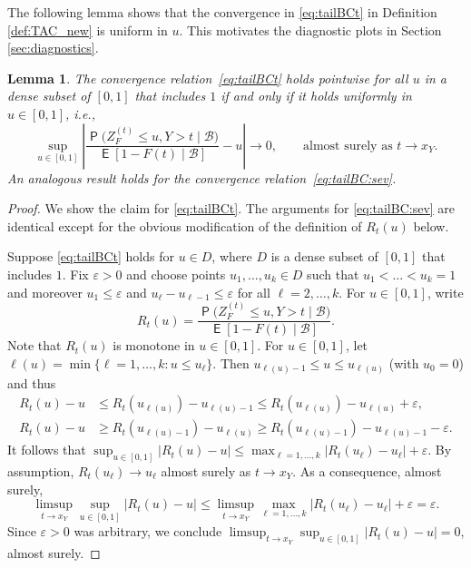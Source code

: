 \documentclass[12pt]{article}
\newcommand{\E}{\operatorname{\mathsf{E}}}
\newcommand{\Q}{\operatorname{\mathsf{P}}}
\newcommand{\Bb}{\mathcal{B}}
\newcommand{\1}{\mathbf{1}} %
\newcommand{\eps}{\varepsilon}
\newcommand{\ZFt}{Z_{F}^{(t)}} %
\newtheorem{lemma}[propo]{Lemma}
\theoremstyle{definition}
\begin{document}
The following lemma shows that the convergence in \eqref{eq:tailBCt} in Definition \ref{def:TAC_new} is uniform in $u$. This motivates the diagnostic plots in Section \ref{sec:diagnostics}.

\begin{lemma}
\label{lem:unifconv-u}
	The convergence relation~\eqref{eq:tailBCt} holds pointwise for all $u$ in a dense subset of $[0, 1]$ that includes $1$ if and only if it holds uniformly in $u \in [0, 1]$, i.e.,
	\[
		\sup_{u \in [0, 1]} \left|
			\frac{\Q\bigl(\ZFt \le u, Y > t \mid \Bb\bigr)}{\E[1-F(t)\mid \Bb]} - u
		\right|
		\to 0, \qquad \text{almost surely as $t \to x_Y$.}
	\]
    An analogous result holds for the convergence relation~\eqref{eq:tailBC:sev}.
\end{lemma}

\begin{proof}
	We show the claim for \eqref{eq:tailBCt}. The arguments for \eqref{eq:tailBC:sev} are identical except for the obvious modification of the definition of $R_t(u)$ below.

	Suppose \eqref{eq:tailBCt} holds for $u \in D$, where $D$ is a dense subset of $[0, 1]$ that includes $1$. Fix $\eps > 0$ and choose points $u_1,\ldots,u_k \in D$ such that $u_1 < \ldots < u_k = 1$ and moreover $u_1 \le \eps$ and $u_\ell - u_{\ell-1} \le \eps$ for all $\ell = 2, \ldots, k$. For $u \in [0, 1]$, write
	\[
		R_t(u) 
		= \frac{\Q\bigl(\ZFt \le u, Y > t \mid \Bb\bigr)}{\E[1-F(t)\mid \Bb]}.
	\]
	Note that $R_t(u)$ is monotone in $u \in [0, 1]$. For $u \in [0, 1]$, let $\ell(u) = \min \{ \ell = 1,\ldots,k : u \le u_\ell \}$. Then $u_{\ell(u)-1} \le u \le u_{\ell(u)}$ (with $u_0 = 0$) and thus
	\begin{align*}
		R_t(u) - u 
		&\le R_t(u_{\ell(u)}) - u_{\ell(u)-1}
		\le R_t(u_{\ell(u)}) - u_{\ell(u)} + \eps,\\
		R_t(u) - u
		&\ge R_t(u_{\ell(u)-1}) - u_{\ell(u)}
		\ge R_t(u_{\ell(u)-1}) - u_{\ell(u)-1} - \eps.
	\end{align*}
	It follows that
		$\sup_{u \in [0, 1]}
		\left| R_t(u) - u \right|
		\le \max_{\ell=1,\ldots,k}
		\left| R_t(u_\ell) - u_\ell \right| + \eps$.
	By assumption, $R_t(u_\ell) \to u_\ell$ almost surely as $t \to x_Y$.
	As a consequence, almost surely, 
 \[\limsup_{t \to x_Y} \sup_{u \in [0, 1]}
		\left| R_t(u) - u \right| 
		\le \limsup_{t \to x_Y} \max_{\ell=1,\ldots,k}
		\left| R_t(u_\ell) - u_\ell \right|
		+ \eps
		= \eps.
  \]
	Since $\eps > 0$ was arbitrary, we conclude $\limsup_{t \to x_Y} \sup_{u \in [0, 1]}
		\left| R_t(u) - u \right|
		= 0$, almost surely.
\end{proof}
\end{document}
